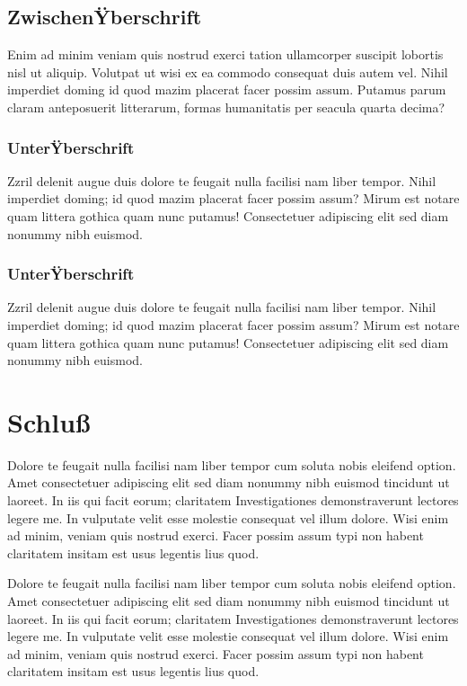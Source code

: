 \documentclass[a4paper,12pt]{scrartcl}
\begin{document}
\subsection{ZwischenŸberschrift}
Enim ad minim veniam quis nostrud exerci tation ullamcorper suscipit lobortis nisl ut aliquip. Volutpat ut wisi ex ea commodo consequat duis autem vel. Nihil imperdiet doming id quod mazim placerat facer possim assum. Putamus parum claram anteposuerit litterarum, formas humanitatis per seacula quarta decima?

\subsubsection{UnterŸberschrift}
Zzril delenit augue duis dolore te feugait nulla facilisi nam liber tempor. Nihil imperdiet doming; id quod mazim placerat facer possim assum? Mirum est notare quam littera gothica quam nunc putamus! Consectetuer adipiscing elit sed diam nonummy nibh euismod.

\subsubsection{UnterŸberschrift}
Zzril delenit augue duis dolore te feugait nulla facilisi nam liber tempor. Nihil imperdiet doming; id quod mazim placerat facer possim assum? Mirum est notare quam littera gothica quam nunc putamus! Consectetuer adipiscing elit sed diam nonummy nibh euismod.

\section{Schluß}
Dolore te feugait nulla facilisi nam liber tempor cum soluta nobis eleifend option. Amet consectetuer adipiscing elit sed diam nonummy nibh euismod tincidunt ut laoreet. In iis qui facit eorum; claritatem Investigationes demonstraverunt lectores legere me. In vulputate velit esse molestie consequat vel illum dolore. Wisi enim ad minim, veniam quis nostrud exerci. Facer possim assum typi non habent claritatem insitam est usus legentis lius quod.

Dolore te feugait nulla facilisi nam liber tempor cum soluta nobis eleifend option. Amet consectetuer adipiscing elit sed diam nonummy nibh euismod tincidunt ut laoreet. In iis qui facit eorum; claritatem Investigationes demonstraverunt lectores legere me. In vulputate velit esse molestie consequat vel illum dolore. Wisi enim ad minim, veniam quis nostrud exerci. Facer possim assum typi non habent claritatem insitam est usus legentis lius quod.
\end{document}
